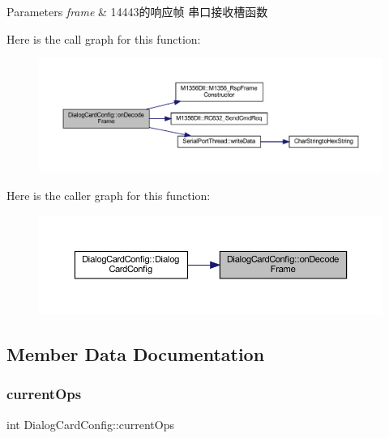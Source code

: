 \begin{DoxyParams}{Parameters}
{\em frame} & 14443的响应帧 串口接收槽函数 \\
\hline
\end{DoxyParams}
Here is the call graph for this function\+:
\nopagebreak
\begin{figure}[H]
\begin{center}
\leavevmode
\includegraphics[width=350pt]{class_dialog_card_config_aed468b0bda0695d288795c0d8ef32dd8_cgraph}
\end{center}
\end{figure}
Here is the caller graph for this function\+:
\nopagebreak
\begin{figure}[H]
\begin{center}
\leavevmode
\includegraphics[width=350pt]{class_dialog_card_config_aed468b0bda0695d288795c0d8ef32dd8_icgraph}
\end{center}
\end{figure}


\subsection{Member Data Documentation}
\mbox{\label{class_dialog_card_config_a076723dcc45e32c71869a637e0ce26c9}} 
\subsubsection{\texorpdfstring{currentOps}{currentOps}}
{\footnotesize\ttfamily int Dialog\+Card\+Config\+::current\+Ops\hspace{0.3cm}{\ttfamily [private]}}

